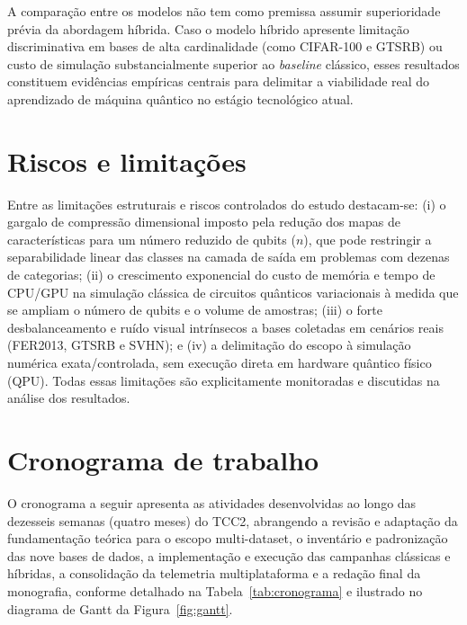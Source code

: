 \documentclass[
    12pt,
    openright,
    oneside,
    a4paper,
    english,
    brazil
]{abntex2}
\begin{document}
A comparação entre os modelos não tem como premissa assumir superioridade prévia da abordagem híbrida. Caso o modelo híbrido apresente limitação discriminativa em bases de alta cardinalidade (como CIFAR-100 e GTSRB) ou custo de simulação substancialmente superior ao \textit{baseline} clássico, esses resultados constituem evidências empíricas centrais para delimitar a viabilidade real do aprendizado de máquina quântico no estágio tecnológico atual.

\section{Riscos e limitações}

Entre as limitações estruturais e riscos controlados do estudo destacam-se: (i) o gargalo de compressão dimensional imposto pela redução dos mapas de características para um número reduzido de qubits (\(n\)), que pode restringir a separabilidade linear das classes na camada de saída em problemas com dezenas de categorias; (ii) o crescimento exponencial do custo de memória e tempo de CPU/GPU na simulação clássica de circuitos quânticos variacionais à medida que se ampliam o número de qubits e o volume de amostras; (iii) o forte desbalanceamento e ruído visual intrínsecos a bases coletadas em cenários reais (FER2013, GTSRB e SVHN); e (iv) a delimitação do escopo à simulação numérica exata/controlada, sem execução direta em hardware quântico físico (QPU). Todas essas limitações são explicitamente monitoradas e discutidas na análise dos resultados.

\section{Cronograma de trabalho}
\label{sec:cronograma}

O cronograma a seguir apresenta as atividades desenvolvidas ao longo das dezesseis semanas (quatro meses) do TCC2, abrangendo a revisão e adaptação da fundamentação teórica para o escopo multi-dataset, o inventário e padronização das nove bases de dados, a implementação e execução das campanhas clássicas e híbridas, a consolidação da telemetria multiplataforma e a redação final da monografia, conforme detalhado na Tabela~\ref{tab:cronograma} e ilustrado no diagrama de Gantt da Figura~\ref{fig:gantt}.
\end{document}

